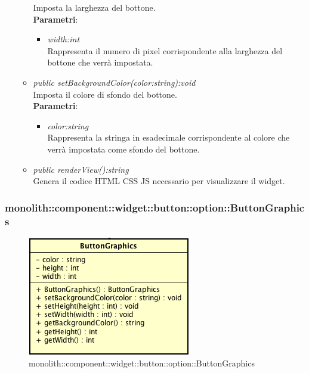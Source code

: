\begin{itemize}
\begin{itemize}
	Imposta la larghezza del bottone.
		\\ \textbf{Parametri}: \begin{itemize}
		\item \textit{width:int}\\
		Rappresenta il numero di pixel corrispondente alla larghezza del bottone che verrà impostata.
		\end{itemize}
	\item \textit{public setBackgroundColor(color:string):void}\\
	Imposta il colore di sfondo del bottone.
		\\ \textbf{Parametri}: \begin{itemize}
		\item \textit{color:string}\\
		Rappresenta la stringa in esadecimale corrispondente al colore che verrà impostata come sfondo del bottone.
		\end{itemize}
	\item \textit{public renderView():string}\\
	Genera il codice HTML CSS JS necessario per visualizzare il widget.
	\end{itemize}
\end{itemize}

\subsubsection{monolith::component::widget::button::option::ButtonGraphics}

\label{monolith::component::widget::button::option::ButtonGraphics}
\begin{figure}[H]
	\centering
	\includegraphics[scale=0.5]{Sezioni/SottosezioniST/img/ButtonGraphics.png}
	\caption{monolith::component::widget::button::option::ButtonGraphics}
\end{figure}

